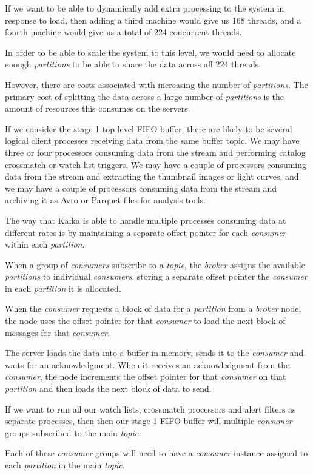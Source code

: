 \documentclass{article}
\newcommand{\avro} {Avro\xspace}
\newcommand{\parquet} {Parquet\xspace}
\newcommand{\kftopic} {\textit{topic}\xspace}
\newcommand{\kfbroker} {\textit{broker}\xspace}
\newcommand{\kfconsumer} {\textit{consumer}\xspace}
\newcommand{\kfconsumers} {\textit{consumers}\xspace}
\newcommand{\kfpartition} {\textit{partition}\xspace}
\newcommand{\kfpartitions} {\textit{partitions}\xspace}
\newcommand{\crossmatch} {crossmatch\xspace}
\begin{document}
If we want to be able to dynamically add extra processing to the system in response to load, then adding a third machine would give us 168 threads, and a fourth machine would give us a total of 224 concurrent threads.

In order to be able to scale the system to this level, we would need to allocate enough \kfpartitions to be able to share the data across all 224 threads.

However, there are costs associated with increasing the number of \kfpartitions. The primary cost of splitting the data across a large number of \kfpartitions is the amount of resources this consumes on the servers.

If we consider the stage 1 top level FIFO buffer, there are likely to be several logical client processes receiving data from the same buffer topic.
We may have three or four processors consuming data from the stream and performing catalog \crossmatch or watch list triggers.
We may have a couple of processors consuming data from the stream and extracting the thumbnail images or light curves, and we may have a couple of processors consuming data from the stream and archiving it as \avro or \parquet files for analysis tools.

The way that Kafka is able to handle multiple processes consuming data at different rates is by maintaining a separate offset pointer for each \kfconsumer within each \kfpartition.

When a group of \kfconsumers subscribe to a \kftopic, the \kfbroker assigns the available \kfpartitions to individual \kfconsumers, storing a separate offset pointer the \kfconsumer in each \kfpartition it is allocated.

When the \kfconsumer requests a block of data for a \kfpartition from a \kfbroker node, the node uses the offset pointer for that \kfconsumer to load the next block of messages for that \kfconsumer.

The server loads the data into a buffer in memory, sends it to the \kfconsumer and waits for an acknowledgment.
When it receives an acknowledgment from the \kfconsumer, the node increments the offset pointer for that \kfconsumer on that \kfpartition and then loads the next block of data to send.

If we want to run all our watch lists, \crossmatch processors and alert filters as separate processes, then then our stage 1 FIFO buffer will multiple \kfconsumer groups subscribed to the main \kftopic.

Each of these \kfconsumer groups will need to have a \kfconsumer instance assigned to each \kfpartition in the main \kftopic.
\end{document}
